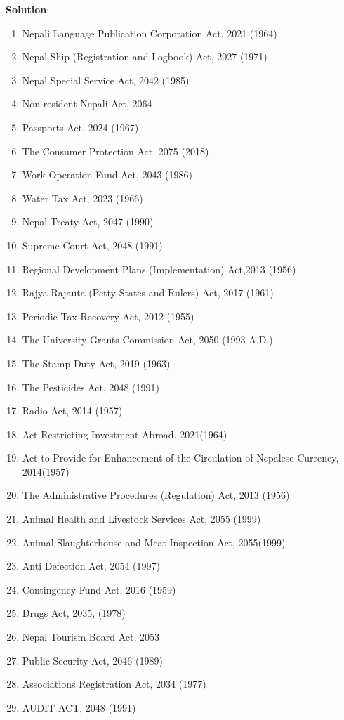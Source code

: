 \documentclass[
  openany]{book}
\newenvironment{solution}{ {\bfseries Solution}:}{}
\begin{document}
\begin{questions}
\begin{solution}
\begin{enumerate}
\item Nepali Language Publication Corporation Act, 2021 (1964)
\item Nepal Ship (Registration and Logbook) Act, 2027 (1971)
\item Nepal Special Service Act, 2042 (1985)
\item Non-resident Nepali Act, 2064
\item Passports Act, 2024 (1967)
\item The Consumer Protection Act, 2075 (2018)
\item Work Operation Fund Act, 2043 (1986)
\item Water Tax Act, 2023 (1966)
\item Nepal Treaty Act, 2047 (1990)
\item Supreme Court Act, 2048 (1991)
\item Regional Development Plans (Implementation) Act,2013 (1956)
\item Rajya Rajauta (Petty States and Rulers) Act, 2017 (1961)
\item Periodic Tax Recovery Act, 2012 (1955)
\item The University Grants Commission Act, 2050 (1993 A.D.)
\item The Stamp Duty Act, 2019 (1963)
\item The Pesticides Act, 2048 (1991)
\item Radio Act, 2014 (1957)
\item Act Restricting Investment Abroad, 2021(1964)
\item Act to Provide for Enhancement of the Circulation of Nepalese Currency, 2014(1957)
\item The Administrative Procedures (Regulation) Act, 2013 (1956)
\item Animal Health and Livestock Services Act, 2055 (1999)
\item Animal Slaughterhouse and Meat Inspection Act, 2055(1999)
\item Anti Defection Act, 2054 (1997)
\item Contingency Fund Act, 2016 (1959)
\item Drugs Act, 2035, (1978)
\item Nepal Tourism Board Act, 2053
\item Public Security Act, 2046 (1989)
\item Associations Registration Act, 2034 (1977)
\item AUDIT ACT, 2048 (1991)

\end{enumerate}
\end{solution}
\end{questions}
\end{document}
